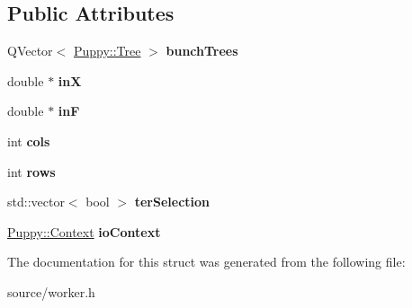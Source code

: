 \subsection*{Public Attributes}
\begin{DoxyCompactItemize}
\item 
\hypertarget{structWorker_1_1TreeContainer_a591e097ef7fa6a9418d027830ca7860e}{}Q\+Vector$<$ \hyperlink{classPuppy_1_1Tree}{Puppy\+::\+Tree} $>$ {\bfseries bunch\+Trees}\label{structWorker_1_1TreeContainer_a591e097ef7fa6a9418d027830ca7860e}

\item 
\hypertarget{structWorker_1_1TreeContainer_a3b9a9cfed47a6737cc38fd9bc9ca19da}{}double $\ast$ {\bfseries in\+X}\label{structWorker_1_1TreeContainer_a3b9a9cfed47a6737cc38fd9bc9ca19da}

\item 
\hypertarget{structWorker_1_1TreeContainer_a9b882435375309fdc4e0d17f742320f6}{}double $\ast$ {\bfseries in\+F}\label{structWorker_1_1TreeContainer_a9b882435375309fdc4e0d17f742320f6}

\item 
\hypertarget{structWorker_1_1TreeContainer_a6737fc8268a047d1255fda12d344d3c8}{}int {\bfseries cols}\label{structWorker_1_1TreeContainer_a6737fc8268a047d1255fda12d344d3c8}

\item 
\hypertarget{structWorker_1_1TreeContainer_a7fd80a20bb45dec87a9963f4254990f1}{}int {\bfseries rows}\label{structWorker_1_1TreeContainer_a7fd80a20bb45dec87a9963f4254990f1}

\item 
\hypertarget{structWorker_1_1TreeContainer_aebbbf7d67fe3b7b908770e82d90e2d95}{}std\+::vector$<$ bool $>$ {\bfseries ter\+Selection}\label{structWorker_1_1TreeContainer_aebbbf7d67fe3b7b908770e82d90e2d95}

\item 
\hypertarget{structWorker_1_1TreeContainer_aac19239ef9da86845129cf12c0c2d1ca}{}\hyperlink{classPuppy_1_1Context}{Puppy\+::\+Context} {\bfseries io\+Context}\label{structWorker_1_1TreeContainer_aac19239ef9da86845129cf12c0c2d1ca}

\end{DoxyCompactItemize}


The documentation for this struct was generated from the following file\+:\begin{DoxyCompactItemize}
\item 
source/worker.\+h\end{DoxyCompactItemize}
